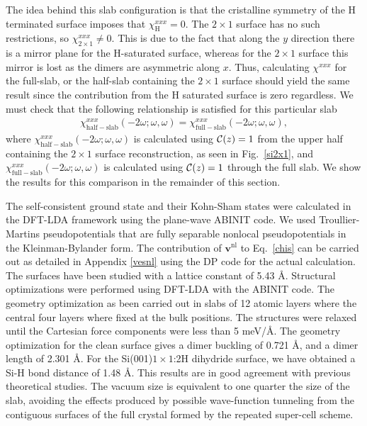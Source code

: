 \documentclass[floatfix,prb,aps,superscriptaddress,showpacs,11pt,preprint,letterpaper]{revtex4}
\begin{document}
The idea behind this slab configuration is that the 
cristalline symmetry of the H terminated surface imposes that 
$\chi_{\mathrm{H}}^{xxx}=0$.
 The $2\times 1$ surface has no 
such restrictions, so $\chi_{2\times 1}^{xxx}\ne 0$.
This is due to the fact that along the $y$ direction there is a mirror plane for the
H-saturated surface, whereas 
for the $2\times 1$ surface this mirror is lost as the dimers are
asymmetric along $x$. 
Thus, calculating $\chi^{xxx}$ for the full-slab, or the 
half-slab containing the $2\times 1$ surface\cite{note1}
should yield the same result since the contribution from the H
saturated surface is zero regardless. 
We must check that the following 
relationship is satisfied for this particular slab
\begin{align}\label{hs}
\chi_{\mathrm{half-slab}}^{xxx}(-2\omega;\omega,\omega) 
=
\chi_{\mathrm{full-slab}}^{xxx}(-2\omega;\omega,\omega) 
,
\end{align}
where
$\chi_{\mathrm{half-slab}}^{xxx}(-2\omega;\omega,\omega)$ is calculated using
${\mathbf{\cal C}}(z)=1$ from the upper half containing the $2\times 1$ 
surface reconstruction, as seen in Fig.~\ref{si2x1},
and $\chi_{\mathrm{full-slab}}^{xxx}(-2\omega;\omega,\omega)$ is calculated using
${\mathbf{\cal C}}(z)=1$ through the full slab.
We show the results for this comparison in the remainder 
of this section.


The self-consistent ground state and their Kohn-Sham states were
calculated in the DFT-LDA framework using the plane-wave 
ABINIT code.\cite{abinit}
We used Troullier-Martins pseudopotentials\cite{troullierPRB91} that are 
fully separable nonlocal pseudopotentials in the Kleinman-Bylander 
form.\cite{kleinmanPRL82}
The contribution of $\mathbf{v}^\mathrm{nl}$ to Eq.~\eqref{chis} can be carried out 
as detailed in Appendix \ref{vesnl} using the DP code for 
the actual calculation.\cite{francesco}
%
The surfaces have been studied with a lattice constant of 5.43 \AA. 
Structural optimizations were performed using DFT-LDA
with the ABINIT code.\cite{abinit}  
The geometry optimization as been carried out in slabs of 12
atomic layers where the central four layers where fixed at the bulk
positions.  
The structures were relaxed until the Cartesian force components were less than 5 meV/\AA. 
The geometry optimization for the clean surface gives
a dimer buckling of 0.721 \AA, and a dimer length of 2.301 \AA.  
For the  Si(001)$1\times 1$:2H dihydride surface, we have obtained a Si-H bond distance of 1.48 \AA. 
This results are in good agreement with previous 
theoretical studies.\cite{caramellaPRB09,mendozaPRB06}
The vacuum size is equivalent to one quarter the
size of the slab, avoiding the effects produced by possible 
wave-function tunneling from the contiguous surfaces of the full
crystal formed by the repeated super-cell scheme.\cite{mendozaPRB06}    
\end{document}
